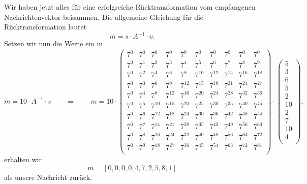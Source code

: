 Wir haben jetzt alles für eine erfolgreiche Rücktransformation vom empfangenen Nachrichtenvektor beisammen.
Die allgemeine Gleichung für die Rücktransformation lautet
\[
m = s \cdot A^{-1} \cdot v.
\]
Setzen wir nun die Werte ein in
%
\[
m = 10 \cdot A^{-1} \cdot v \qquad \Rightarrow \qquad m = 10 \cdot \begin{pmatrix}
	7^0&    7^0&    7^0&    7^0&    7^0&    7^0&    7^0&    7^0&    7^0&    7^0\\
	7^0&	7^1&	7^2&	7^3&	7^4&	7^5&	7^6&	7^7&    7^8&	7^9\\
	7^0&	7^2&	7^4&	7^6&	7^8& 7^{10}& 7^{12}& 7^{14}& 7^{16}& 7^{18}\\
	7^0&	7^3&	7^6&	7^9& 7^{12}& 7^{15}& 7^{18}& 7^{21}& 7^{24}& 7^{27}\\
	7^0&	7^4&	7^8& 7^{12}& 7^{16}& 7^{20}& 7^{24}& 7^{28}& 7^{32}& 7^{36}\\
	7^0&	7^5& 7^{10}& 7^{15}& 7^{20}& 7^{25}& 7^{30}& 7^{35}& 7^{40}& 7^{45}\\
	7^0&	7^6& 7^{12}& 7^{18}& 7^{24}& 7^{30}& 7^{36}& 7^{42}& 7^{48}& 7^{54}\\
	7^0&	7^7& 7^{14}& 7^{21}& 7^{28}& 7^{35}& 7^{42}& 7^{49}& 7^{56}& 7^{63}\\
	7^0&	7^8& 7^{16}& 7^{24}& 7^{32}& 7^{40}& 7^{48}& 7^{56}& 7^{64}& 7^{72}\\
	7^0&	7^9& 7^{18}& 7^{27}& 7^{36}& 7^{45}& 7^{54}& 7^{63}& 7^{72}& 7^{81}\\
\end{pmatrix}
\cdot
\begin{pmatrix}
	5 \\ 3 \\ 6 \\ 5 \\ 2 \\ 10 \\ 2 \\ 7 \\ 10 \\ 4 \\
\end{pmatrix},
\]
erhalten wir
\[
m = [0,0,0,0,4,7,2,5,8,1]
\]
als unsere Nachricht zurück.

